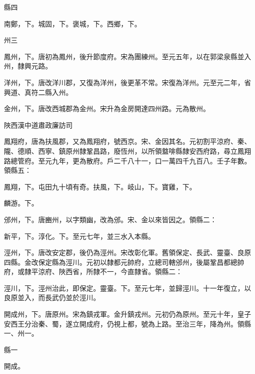 \begin{pinyinscope}
 縣四



 南鄭，下。城固，下。褒城，下。西鄉，下。



 州三



 鳳州，下。唐初為鳳州，後升節度府。宋為團練州。至元五年，以在郭梁泉縣並入州，隸興元路。



 洋州，下。唐改洋川郡，又復為洋州，後更革不常。宋復為洋州。元至元二年，省興道、真符二縣入州。



 金州，下。唐改西城郡為金州。宋升為金房開達四州路。元為散州。



 陜西漢中道肅政廉訪司



 鳳翔府，唐為扶風郡，又為鳳翔府，號西京。宋、金因其名。元初割平涼府、秦、隴、德順、西寧、鎮原州隸鞏昌路，廢恆州，以所領盩啡縣隸安西府路，尋立鳳翔路總管府。至元九年，更為散府。戶二千八十一，口一萬四千九百八。壬子年數。領縣五：



 鳳翔，下。屯田九十頃有奇。扶風，下。岐山，下。寶雞，下。



 麟游。下。



 邠州，下。唐豳州，以字類幽，改為邠。宋、金以來皆因之。領縣二：



 新平，下。淳化。下。至元七年，並三水入本縣。



 涇州，下。唐改安定郡，後仍為涇州。宋改彰化軍。舊領保定、長武、靈臺、良原四縣。金改保定縣為涇川。元初以隸都元帥府，立總司轄邠州，後屬鞏昌都總帥府，或隸平涼府、陜西省，所隸不一，今直隸省。領縣二：



 涇川，下。涇州治此，即保定。靈臺。下。至元七年，並歸涇川。十一年復立，以良原並入，而長武仍並於涇川。



 開成州，下。唐原州。宋為鎮戎軍。金升鎮戎州。元初仍為原州。至元十年，皇子安西王分治秦、蜀，遂立開成府，仍視上都，號為上路。至治三年，降為州。領縣一、州一。



 縣一



 開成。




\end{pinyinscope}
